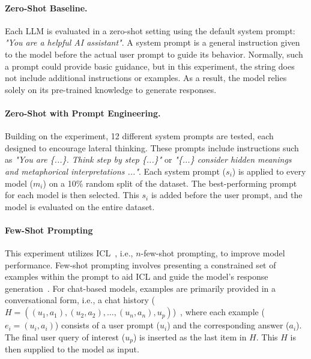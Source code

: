 \paragraph{Zero-Shot Baseline.}
\label{sec:zero-shot-prompt}

Each \ac{LLM} is evaluated in a zero-shot setting using the default system prompt: \textit{"You are a helpful AI assistant"}. A system prompt is a general instruction given to the model before the actual user prompt to guide its behavior. Normally, such a prompt could provide basic guidance, but in this experiment, the string does not include additional instructions or examples. As a result, the model relies solely on its pre-trained knowledge to generate responses.

\paragraph{Zero-Shot with Prompt Engineering.}
\label{sec:zero-shot-prompt-engineering}

Building on the  experiment, 12 different system prompts are tested, each designed to encourage lateral thinking. These prompts include instructions such as \textit{"You are \{...\}. Think step by step \{...\}"} or \textit{"\{...\} consider hidden meanings and metaphorical interpretations {...}"}. Each system prompt ($s_i$) is applied to every model ($m_i$) on a 10\% random split of the dataset. The best-performing prompt for each model is then selected. This $s_i$ is added before the user prompt, and the model is evaluated on the entire dataset.

\paragraph{Few-Shot Prompting}
\label{sec:few-shot-prompt}

This experiment utilizes \acf{ICL}~\cite{brownLanguageModelsAre2020}, i.e., $n$-few-shot prompting, to improve model performance. Few-shot prompting involves presenting a constrained set of examples within the prompt to aid \acl{ICL} and guide the model's response generation~\cite{brownLanguageModelsAre2020}. For chat-based models, examples are primarily provided in a conversational form, i.e., a chat history ($H = ((u_1, a_1), (u_2, a_2), \ldots, (u_n, a_n), u_p)$)~\cite{HowUseFew}, where each example ($e_i = (u_i, a_i)$) consists of a user prompt ($u_i$) and the corresponding answer ($a_i$). The final user query of interest ($u_p$) is inserted as the last item in $H$. This $H$ is then supplied to the model as input.

